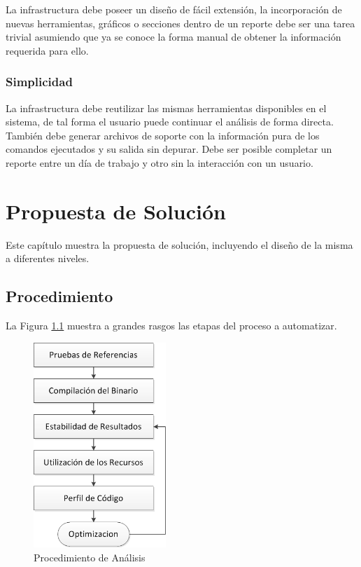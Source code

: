 \documentclass[a4paper]{report}
\begin{document}
La infrastructura debe poseer un diseño de fácil extensión, la incorporación de nuevas herramientas, gráficos o secciones dentro de un reporte debe ser una tarea trivial asumiendo que ya se conoce la forma manual de obtener la información requerida para ello.

\subsection{Simplicidad}

La infrastructura debe reutilizar las mismas herramientas disponibles en el sistema, de tal forma el usuario puede continuar el análisis de forma directa.
También debe generar archivos de soporte con la información pura de los comandos ejecutados y su salida sin depurar.
Debe ser posible completar un reporte entre un día de trabajo y otro sin la interacción con un usuario.

\chapter{Propuesta de Solución} \label{Propuesta de Solucion}

Este capítulo muestra la propuesta de solución, incluyendo el diseño de la misma a diferentes niveles.

\section{Procedimiento}

La Figura \ref{fig:procedure} muestra a grandes rasgos las etapas del proceso a automatizar.

\begin{figure}[H]
\label{fig:procedure}
\centering
\includegraphics[width=5cm]{procedure.png}
\caption{Procedimiento de Análisis}
\end{figure}
\end{document}
